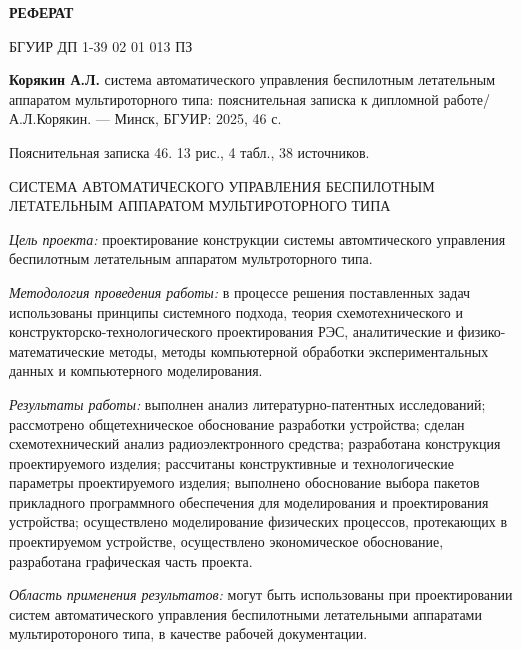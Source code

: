 \thispagestyle{empty} %

\begin{center}  
\textbf{РЕФЕРАТ}
\end{center}

БГУИР ДП 1-39 02 01 013 ПЗ

\textbf{Корякин А.Л.} система автоматического управления
беспилотным летательным аппаратом мультироторного типа:
пояснительная записка к дипломной работе/А.Л.Корякин.
— Минск, БГУИР: 2025, 46 с.

Пояснительная записка 46. 13 рис., 4 табл., 38 источников.

СИСТЕМА АВТОМАТИЧЕСКОГО УПРАВЛЕНИЯ БЕСПИЛОТНЫМ ЛЕТАТЕЛЬНЫМ АППАРАТОМ
МУЛЬТИРОТОРНОГО ТИПА

\textit{Цель проекта:} проектирование конструкции
системы автомтического управления беспилотным летательным аппаратом
мультроторного типа.

\textit{Методология проведения работы:}
в процессе решения поставленных задач использованы принципы системного
подхода, теория схемотехнического и конструкторско-технологического
проектирования РЭС, аналитические и физико-математические методы,
методы компьютерной обработки экспериментальных данных и компьютерного
моделирования.

\textit{Результаты работы:}
выполнен анализ литературно-патентных исследований; рассмотрено
общетехническое обоснование разработки устройства; сделан
схемотехнический анализ радиоэлектронного средства; разработана
конструкция проектируемого изделия; рассчитаны конструктивные и
технологические параметры проектируемого изделия; выполнено
обоснование выбора пакетов прикладного программного обеспечения для
моделирования и проектирования устройства; осуществлено моделирование
физических процессов, протекающих в проектируемом устройстве,
осуществлено экономическое обоснование, разработана графическая часть
проекта.

\textit{Область применения результатов:} могут быть использованы при
проектировании систем автоматического управления беспилотными
летательными аппаратами мультиротороного типа, в качестве рабочей
документации.

\newpage
